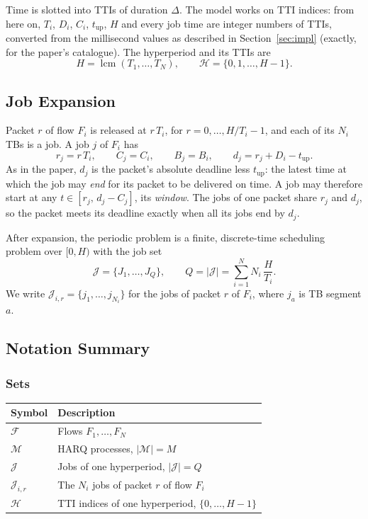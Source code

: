 Time is slotted into TTIs of duration $\Delta$. The model works on TTI
indices: from here on, $T_i$, $D_i$, $C_i$, $t_\mathrm{up}$, $H$ and every
job time are integer numbers of TTIs, converted from the millisecond values
as described in Section~\ref{sec:impl} (exactly, for the paper's catalogue).
The hyperperiod and its TTIs are
\[
H = \operatorname{lcm}(T_1, \dots, T_N), \qquad
\mathcal{H} = \{0, 1, \dots, H-1\}.
\]

\subsection{Job Expansion}

Packet $r$ of flow $F_i$ is released at $r\,T_i$, for
$r = 0, \dots, H/T_i - 1$, and each of its $N_i$ TBs is a job. A job $j$ of
$F_i$ has
\[
r_j = r\,T_i, \qquad C_j = C_i, \qquad B_j = B_i, \qquad
d_j = r_j + D_i - t_\mathrm{up}.
\]
As in the paper, $d_j$ is the packet's absolute deadline less
$t_\mathrm{up}$: the latest time at which the job may \emph{end} for its packet
to be delivered on time. A job may therefore start at any
$t \in [r_j,\, d_j - C_j]$, its \emph{window}. The jobs of one packet share
$r_j$ and $d_j$, so the packet meets its deadline exactly when all its jobs
end by $d_j$.

After expansion, the periodic problem is a finite, discrete-time scheduling
problem over $[0, H)$ with the job set
\[
\mathcal{J} = \{J_1, \dots, J_Q\}, \qquad
Q = |\mathcal{J}| = \sum_{i=1}^{N} N_i \, \frac{H}{T_i}.
\]
We write $\mathcal{J}_{i,r} = \{j_1, \dots, j_{N_i}\}$ for the jobs of packet
$r$ of $F_i$, where $j_a$ is TB segment $a$.

\subsection{Notation Summary}

\subsubsection*{Sets}
\begin{center}
\begin{tabular}{ll}
\toprule
\textbf{Symbol} & \textbf{Description} \\
\midrule
$\mathcal{F}$ & Flows $F_1, \dots, F_N$ \\
$\mathcal{M}$ & HARQ processes, $|\mathcal{M}| = M$ \\
$\mathcal{J}$ & Jobs of one hyperperiod, $|\mathcal{J}| = Q$ \\
$\mathcal{J}_{i,r}$ & The $N_i$ jobs of packet $r$ of flow $F_i$ \\
$\mathcal{H}$ & TTI indices of one hyperperiod, $\{0, \dots, H-1\}$ \\
\bottomrule
\end{tabular}
\end{center}

